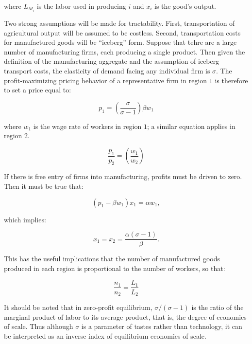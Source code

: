 where $L_{M_i}$ is the labor used in producing $i$ and $x_i$ is the good's output.

Two strong assumptions will be made for tractability. First, transportation of agricultural output will be assumed to be costless. Second, transportation costs for manufactured goods will be ``iceberg'' form. Suppose that tehre are a large number of manufacturing firms, each producing a single product. Then given the definition of the manufacturing aggregate and the assumption of iceberg transport costs, the elasticity of demand facing any individual firm is $\sigma$. The profit-maximizing pricing behavior of a representative firm in region $1$ is therefore to set a price equal to:

\begin{equation}
  p_1 = (\frac{\sigma}{\sigma - 1}) \beta w_1
\end{equation}

where $w_1$ is the wage rate of workers in region $1$; a similar equation applies in region $2$.

\begin{equation}
  \frac{p_1}{p_2} = \left(\frac{w_1}{w_2}\right)
\end{equation}

If there is free entry of firms into manufacturing, profits must be driven to zero. Then it must be true that:

\begin{equation}
  (p_1 - \beta w_1) x_1 = \alpha w_1,
\end{equation}

which implies:

\begin{equation}
  x_1 = x_2 = \frac{\alpha(\sigma - 1)}{\beta}.
\end{equation}

This has the useful implications that the number of manufactured goods produced in each region is proportional to the number of workers, so that:

\begin{equation}
  \frac{n_1}{n_2} = \frac{L_1}{L_2}
\end{equation}

It should be noted that in zero-profit equilibrium, $\sigma / (\sigma - 1)$ is the ratio of the marginal product of labor to its average product, that is, the degree of economics of scale. Thus although $\sigma$ is a parameter of tastes rather than technology, it can be interpreted as an inverse index of equilibrium economies of scale.

